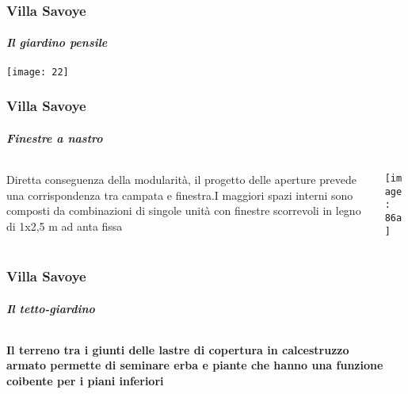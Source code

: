 \documentclass{beamer}
\begin{document}
\begin{frame}
\frametitle{Villa Savoye}
\framesubtitle{\textit{Il giardino pensile}}

\texttt{[image: 22]}

\end{frame}

\begin{frame}
\frametitle{Villa Savoye}
\framesubtitle{\textit{Finestre a nastro}}

\begin{columns}
\begin{column}{0.4\textwidth}

Diretta conseguenza della modularità, il progetto delle aperture prevede una corrispondenza tra campata e finestra.I maggiori spazi interni sono composti da combinazioni di singole unità con finestre scorrevoli in legno di 1x2,5 m ad anta fissa \\

\end{column}

\begin{column}{0.5\textwidth}

\texttt{[image: 86a]}

\end{column}
\end{columns}

\end{frame}

\usebackgroundtemplate{
\parbox{\paperwidth}{\texttt{[image: 13]}}}

\begin{frame}
\frametitle{Villa Savoye}
\framesubtitle{\textit{Il tetto-giardino}}

\begin{columns}
\begin{column}{0.5\textwidth}

\textbf{Il terreno tra i giunti delle lastre di copertura in calcestruzzo armato permette di seminare erba e piante che hanno una funzione coibente per i piani inferiori}

\end{column}

\begin{column}{0.4\textwidth}
\end{column}
\end{columns}

\end{frame}
\end{document}
